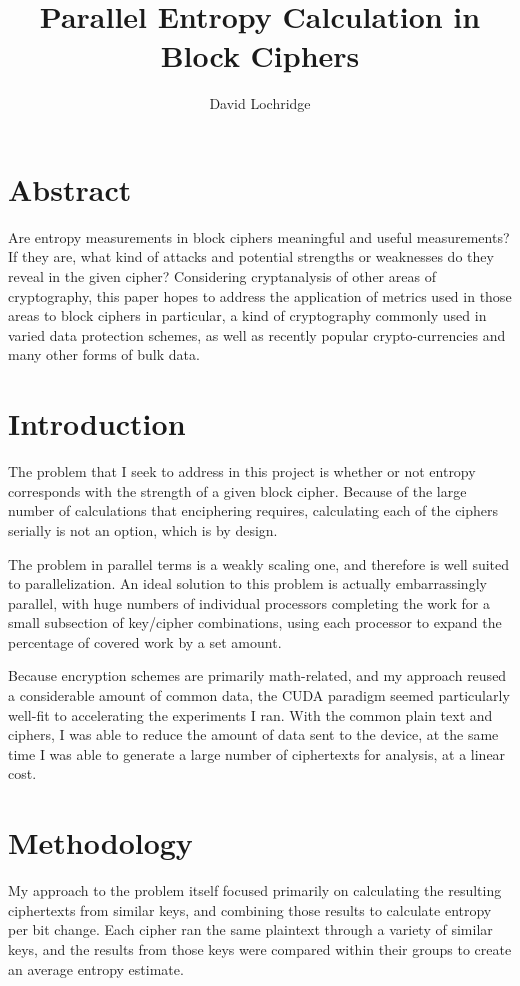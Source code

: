\documentclass[11.5pt]{article}
\title{Parallel Entropy Calculation in Block Ciphers}
\author{David Lochridge}
\begin{document}
\maketitle

\section{Abstract}
Are entropy measurements in block ciphers meaningful and useful measurements? If they are, what kind of attacks and potential strengths or weaknesses do they reveal in the given cipher? Considering cryptanalysis of other areas of cryptography, this paper hopes to address the application of metrics used in those areas to block ciphers in particular, a kind of cryptography commonly used in varied data protection schemes, as well as recently popular crypto-currencies and many other forms of bulk data.

\section{Introduction}
The problem that I seek to address in this project is whether or not entropy corresponds with the strength of a given block cipher. Because of the large number of calculations that enciphering requires, calculating each of the ciphers serially is not an option, which is by design.

The problem in parallel terms is a weakly scaling one, and therefore is well suited to parallelization. An ideal solution to this problem is actually embarrassingly parallel, with huge numbers of individual processors completing the work for a small subsection of key/cipher combinations, using each processor to expand the percentage of covered work by a set amount.

Because encryption schemes are primarily math-related, and my approach reused a considerable amount of common data, the CUDA paradigm seemed particularly well-fit to accelerating the experiments I ran. With the common plain text and ciphers, I was able to reduce the amount of data sent to the device, at the same time I was able to generate a large number of ciphertexts for analysis, at a linear cost.

\section{Methodology}

My approach to the problem itself focused primarily on calculating the resulting ciphertexts from similar keys, and combining those results to calculate entropy per bit change. Each cipher ran the same plaintext through a variety of similar keys, and the results from those keys were compared within their groups to create an average entropy estimate.
\end{document}
